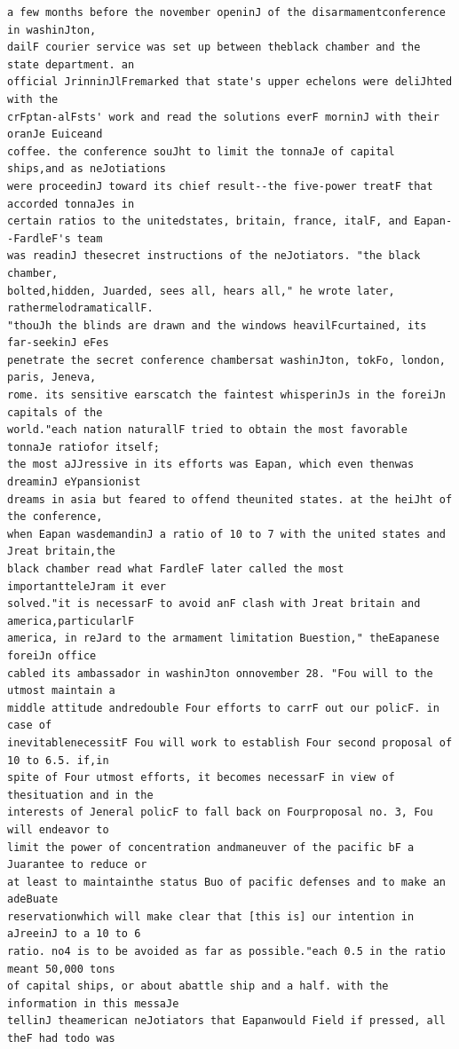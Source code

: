 \documentclass[11pt,a4paper]{article}
\begin{document}
\begin{lstlisting}[style=ciphertext,caption={Complete text after iteration 10}]
a few months before the november openinJ of the disarmamentconference in washinJton,
dailF courier service was set up between theblack chamber and the state department. an
official JrinninJlFremarked that state's upper echelons were deliJhted with the
crFptan-alFsts' work and read the solutions everF morninJ with their oranJe Euiceand
coffee. the conference souJht to limit the tonnaJe of capital ships,and as neJotiations
were proceedinJ toward its chief result--the five-power treatF that accorded tonnaJes in
certain ratios to the unitedstates, britain, france, italF, and Eapan--FardleF's team
was readinJ thesecret instructions of the neJotiators. "the black chamber,
bolted,hidden, Juarded, sees all, hears all," he wrote later, rathermelodramaticallF.
"thouJh the blinds are drawn and the windows heavilFcurtained, its far-seekinJ eFes
penetrate the secret conference chambersat washinJton, tokFo, london, paris, Jeneva,
rome. its sensitive earscatch the faintest whisperinJs in the foreiJn capitals of the
world."each nation naturallF tried to obtain the most favorable tonnaJe ratiofor itself;
the most aJJressive in its efforts was Eapan, which even thenwas dreaminJ eYpansionist
dreams in asia but feared to offend theunited states. at the heiJht of the conference,
when Eapan wasdemandinJ a ratio of 10 to 7 with the united states and Jreat britain,the
black chamber read what FardleF later called the most importantteleJram it ever
solved."it is necessarF to avoid anF clash with Jreat britain and america,particularlF
america, in reJard to the armament limitation Buestion," theEapanese foreiJn office
cabled its ambassador in washinJton onnovember 28. "Fou will to the utmost maintain a
middle attitude andredouble Four efforts to carrF out our policF. in case of
inevitablenecessitF Fou will work to establish Four second proposal of 10 to 6.5. if,in
spite of Four utmost efforts, it becomes necessarF in view of thesituation and in the
interests of Jeneral policF to fall back on Fourproposal no. 3, Fou will endeavor to
limit the power of concentration andmaneuver of the pacific bF a Juarantee to reduce or
at least to maintainthe status Buo of pacific defenses and to make an adeBuate
reservationwhich will make clear that [this is] our intention in aJreeinJ to a 10 to 6
ratio. no4 is to be avoided as far as possible."each 0.5 in the ratio meant 50,000 tons
of capital ships, or about abattle ship and a half. with the information in this messaJe
tellinJ theamerican neJotiators that Eapanwould Field if pressed, all theF had todo was

\end{lstlisting}
\end{document}
